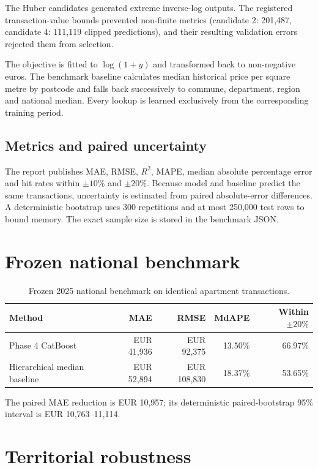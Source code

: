 \documentclass[11pt,a4paper]{article}
\begin{document}
The Huber candidates generated extreme inverse-log outputs. The registered transaction-value bounds prevented non-finite metrics (candidate 2: 201,487, candidate 4: 111,119 clipped predictions), and their resulting validation errors rejected them from selection.

The objective is fitted to $\log(1+y)$ and transformed back to non-negative
euros. The benchmark baseline calculates median historical price per square
metre by postcode and falls back successively to commune, department, region
and national median. Every lookup is learned exclusively from the corresponding
training period.

\subsection{Metrics and paired uncertainty}

The report publishes MAE, RMSE, $R^2$, MAPE, median absolute percentage error
and hit rates within $\pm10\%$ and $\pm20\%$. Because model and baseline predict
the same transactions, uncertainty is estimated from paired absolute-error
differences. A deterministic bootstrap uses 300 repetitions and at most 250,000
test rows to bound memory. The exact sample size is stored in the benchmark JSON.

\section{Frozen national benchmark}


\begin{table}[H]
\centering
\caption{Frozen 2025 national benchmark on identical apartment transactions.}
\label{tab:national-benchmark}
\begin{tabular}{lrrrr}
\toprule
Method & MAE & RMSE & MdAPE & Within $\pm20\%$ \\
\midrule
Phase 4 CatBoost & EUR 41,936 & EUR 92,375 & 13.50\% & 66.97\% \\
Hierarchical median baseline & EUR 52,894 & EUR 108,830 & 18.37\% & 53.65\% \\
\bottomrule
\end{tabular}
\end{table}

The paired MAE reduction is EUR 10,957;
its deterministic paired-bootstrap 95\% interval is EUR 10,763--11,114.


\section{Territorial robustness}
\end{document}
